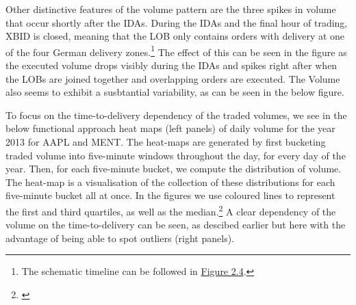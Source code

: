 \documentclass[12pt,a4paper]{cau_thesis}
\begin{document}
Other distinctive features of the volume pattern are the three spikes
in volume that occur shortly after the IDAs. During the IDAs and the
final hour of trading, XBID is closed, meaning that the LOB only
contains orders with delivery at one of the four German delivery
zones.\footnote{The schematic timeline can be followed in
    \hyperref[fig:ida_acutions_xbid_closure]{Figure 2.4}.} The effect of
this can be seen in the figure as the executed volume drops visibly
during the IDAs and spikes right after when the LOBs are joined
together and overlapping orders are executed. The Volume also seems
to exhibit a susbtantial variability, as can be seen in the below
figure.
\begin{figure}[htbp]
    \vspace*{0.5cm}
    \centering
    \label{fig:intraday_volume}
\end{figure}
To focus on the time-to-delivery dependency of the traded volumes, we
see in the below functional approach heat maps (left panels) of daily
volume for the year 2013 for AAPL and MENT. The heat-maps are
generated by first bucketing traded volume into five-minute windows
throughout the day, for every day of the year. Then, for each
five-minute bucket, we compute the distribution of volume. The
heat-map is a visualisation of the collection of these distributions
for each five-minute bucket all at once. In the figures we use
coloured lines to represent the first and third quartiles, as well as
the median.\footnote{\cite[See][, p.65.]{cartea2015algorithmic}} A
clear dependency of the volume on the time-to-delivery can be seen,
as descibed earlier but here with the advantage of being able to spot
outliers (right panels).
\end{document}
